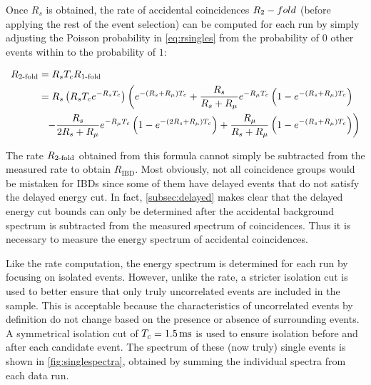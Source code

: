 Once $R_s$ is obtained, the rate of accidental coincidences $R_2-fold$
(before applying the rest of the event selection)
can be computed for each run
by simply adjusting the Poisson probability in \cref{eq:rsingles}
from the probability of $0$ other events within \tc{}
to the probability of $1$:

\begin{align}
    \label{eq:racc}
    \begin{split}
        R_{\text{\fold{2}}} &= R_s\tc R_{\text{\fold{1}}} \\
                   &= R_s \left(R_s\tc e^{-R_s\tc}\right)
          \left(
              e^{-(R_s + R_\mu)\tc} +
              \frac{R_s}{R_s+R_\mu} e^{-R_\mu\tc}
              \left(
                  1 - e^{-(R_s + R_\mu)\tc}
              \right)
          \right. \\
          &\ \ %
          \left. - \frac{R_s}{2R_s + R_\mu} e^{-R_\mu\tc}
              \left(
                  1 - e^{-(2R_s + R_\mu)\tc}
              \right) +
              \frac{R_\mu}{R_s + R_\mu}
              \left(
                  1 - e^{-(R_s + R_\mu)\tc}
              \right)
          \right)
    \end{split}
\end{align}

The rate $R_{\text{\ensuremath{2}-fold}}$ obtained from this formula
cannot simply be subtracted from the measured  rate
to obtain $R_{\text{IBD}}$.
Most obviously, not all  coincidence groups would be
mistaken for IBDs since some of them have delayed events that
do not satisfy the delayed energy cut.
In fact, \cref{subsec:delayed} makes clear that the delayed energy cut bounds
can only be determined after the accidental background spectrum
is subtracted from the measured spectrum of  coincidences.
Thus it is necessary to measure the energy spectrum of
accidental coincidences.

Like the rate computation, the energy spectrum is determined for each run
by focusing on isolated events.
However, unlike the rate, a stricter isolation cut is used
to better ensure that only truly uncorrelated events are included in the sample.
This is acceptable because the characteristics of uncorrelated events
by definition do not change based on the presence or absence
of surrounding events.
A symmetrical isolation cut of $T_c=\SI{1.5}{\milli\second}$ is used
to ensure isolation before and after each candidate event.
The spectrum of these (now truly) single events is shown in \cref{fig:singlespectra},
obtained by summing the individual spectra from each data run.

